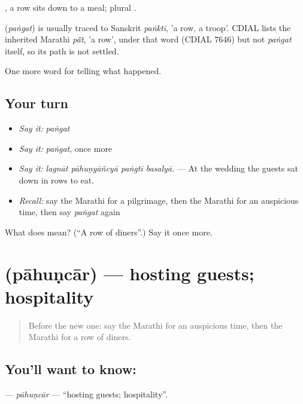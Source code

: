  , a row sits down to a meal; plural .

\begin{cousinweb}
\textbf{} (\emph{paṅgat}) is usually traced to Sanskrit \emph{paṅkti}, 'a row, a troop'. CDIAL lists the inherited Marathi \emph{pā̃t}, 'a row', under that word (CDIAL 7646) but not \emph{paṅgat} itself, so its path is not settled.
\end{cousinweb}

\begin{grammarlens}[title={What you've built}]
One more word for telling what happened.
\end{grammarlens}

\subsection*{Your turn}
\begin{itemize}
\raggedright
  \item \emph{Say it:} \emph{paṅgat}
  \item \emph{Say it:} \emph{paṅgat}, once more
  \item \emph{Say it:} \emph{lagnāt pāhuṇyāñcyā paṅgtī basalyā.} — At the wedding the guests sat down in rows to eat.
  \item \emph{Recall:} say the Marathi for a pilgrimage, then the Marathi for an auspicious time, then say \emph{paṅgat} again
\end{itemize}

\begin{tcolorbox}[breakable,colback=teal!4,colframe=teal!35!black,title={Before you move on}]
What does  mean? (\textquotedblleft{}A row of diners\textquotedblright{}.) Say it once more.
\end{tcolorbox}
\section[\texorpdfstring{\mr{पाहुणचार} (pāhuṇcār)}{पाहुणचार (pāhuṇcār)}]{ (pāhuṇcār) — hosting guests; hospitality}

\label{lesson:MR-C321-pahuncar}



\begin{quote}
Before the new one: say the Marathi for an auspicious time, then the Marathi for a row of diners.
\end{quote}

\subsection*{You'll want to know: }
\textbf{} — \emph{pāhuṇcār} — \textquotedblleft{}hosting guests; hospitality\textquotedblright{}.


